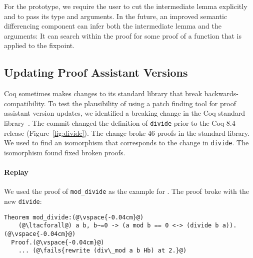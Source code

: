 For the prototype, we require the user to cut the intermediate lemma explicitly and to 
pass its type and arguments.
In the future, an improved semantic differencing component
can infer both the intermediate lemma and the arguments: It can search
within the proof for some proof of a function that is applied
to the fixpoint.

\begin{figure*}
\begin{minipage}{0.48\textwidth}
\lstset{language=coq, aboveskip=0pt,belowskip=0pt}

\end{minipage}
\hfill
\begin{minipage}{0.48\textwidth}
\lstset{language=coq, aboveskip=0pt,belowskip=0pt}

\end{minipage}
\caption[Caption for LOF]{Old (left) and new (right) definitions of \lstinline{divide} in Coq.}
\label{fig:divide}
\end{figure*}

\lstset{language=coq, aboveskip=3pt,belowskip=3pt}

\subsection{Updating Proof Assistant Versions}
\label{sec:coq}

Coq sometimes makes changes to its standard library that break
backwards-compatibility.
To test the plausibility of using a patch finding tool for proof assistant version updates,
we identified a breaking change in the Coq standard library~\cite{coq84commit}.
The commit changed the definition of \lstinline{divide} prior to the Coq 8.4 release (Figure~\ref{fig:divide}).
The change broke 46 proofs in the standard library.
We used \sysname to find an isomorphism that corresponds to the change in \lstinline{divide}.
The isomorphism \sysname found fixed broken proofs.

\paragraph{Replay} We used the proof of \lstinline{mod_divide} as the example for \sysname.
The proof broke with the new \lstinline{divide}:

\begin{lstlisting}[language=coq]
  Theorem mod_divide:(@\vspace{-0.04cm}@)
    (@\ltacforall@) a b, b~=0 -> (a mod b == 0 <-> (divide b a)).(@\vspace{-0.04cm}@)
  Proof.(@\vspace{-0.04cm}@)
    ... (@\fails{rewrite (div\_mod a b Hb) at 2.}@)
\end{lstlisting}

